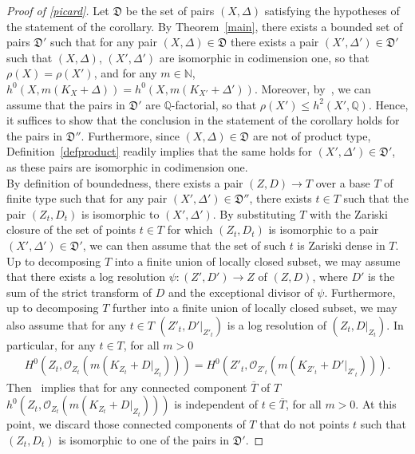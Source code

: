 \documentclass{amsart}[12pt,a4paper]
\theoremstyle{definition}
\begin{document}
\begin{proof}[Proof of \ref{picard}]
Let $\mathfrak{D}$ be the set of pairs $(X, \Delta)$ satisfying the hypotheses of the statement of the corollary.
By Theorem~\ref{main}, there exists a bounded set of pairs $\mathfrak{D}'$ such that for any pair $(X, \Delta) \in \mathfrak{D}$
there exists a pair $(X', \Delta') \in \mathfrak{D}'$ such that $(X, \Delta)$, $(X', \Delta')$ are isomorphic in codimension one, so that $\rho(X)=\rho(X')$, and for any $m \in \mathbb{N}$, $h^0(X, m(K_X+\Delta))= h^0(X, m(K_{X'}+\Delta'))$.
Moreover, by~\cite[Theorem 6]{MST16}, we can assume that the pairs in $\mathfrak{D}'$ are $\mathbb{Q}$-factorial, so that $\rho(X') \leq h^2(X', \mathbb{Q})$.
Hence, it suffices to show that the conclusion in the statement of the corollary holds for the pairs in $\mathfrak{D}''$.
Furthermore, since $(X, \Delta) \in \mathfrak{D}$ are not of product type, Definition~\ref{defproduct} readily implies that the same holds for $(X', \Delta')\in \mathfrak{D}'$, as these pairs are isomorphic in codimension one.
\\
By definition of boundedness, there exists a pair $(Z, D) \to T$ over a base $T$ of finite type such that for any pair $(X', \Delta') \in \mathfrak{D}''$, there exists $t \in T$ such that the pair $(Z_t, D_t)$ is isomorphic to $(X', \Delta')$.
By substituting $T$ with the Zariski closure of the set of points $t \in T$ for which $(Z_t, D_t)$ is isomorphic to a pair $(X', \Delta') \in \mathfrak{D}'$, we can then assume that the set of such $t$ is Zariski dense in $T$. 
\\
Up to decomposing $T$ into a finite union of locally closed subset, we may assume that there exists a log resolution $\psi\colon (Z', D') \to Z$ of $(Z, D)$, where $D'$ is the sum of the strict transform of $D$ and the exceptional divisor of $\psi$.
Furthermore, up to decomposing $T$ further into a finite union of locally closed subset, we may also assume that for any $t \in T$ $(Z'_t, D'\vert_{Z'_t})$ is a log resolution of $(Z_t, D\vert_{Z_t})$.
In particular, for any $t \in T$, for all $m > 0$
\begin{align*}
H^0(Z_t, \mathcal{O}_{Z_t}(m(K_{Z_t}+D\vert_{Z_t}))) = 
H^0(Z'_t, \mathcal{O}_{Z'_t}(m(K_{Z'_t}+D'\vert_{Z'_t}))).
\end{align*}
Then~\cite[Theorem 4.2]{MR3779687} implies that for any  connected component $\overline{T}$ of $T$ $h^0(Z_t, \mathcal{O}_{Z_t}(m(K_{Z_t}+D\vert_{Z_t})))$ is independent of $t \in \overline{T}$, for all $m >0$.
At this point, we discard those connected components of $T$ that do not points $t$ such that $(Z_t, D_t)$ is isomorphic to one of the pairs in $\mathfrak{D}'$.

\end{proof}
\end{document}
